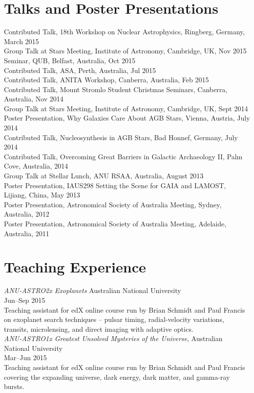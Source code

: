 \documentclass[11pt]{res} %
\begin{document}
\begin{resume}
\section{Talks and Poster Presentations}
	Contributed Talk, 18th Workshop on Nuclear Astrophysics, Ringberg, Germany, March 2015\\
	Group Talk at Stars Meeting, Institute of Astronomy, Cambridge, UK, Nov 2015\\
	Seminar, QUB, Belfast, Australia, Oct 2015\\
	Contributed Talk, ASA, Perth, Australia, Jul 2015\\
	Contributed Talk, ANITA Workshop, Canberra, Australia, Feb 2015\\
	Contributed Talk, Mount Stromlo Student Christmas Seminars, Canberra, Australia, Nov 2014\\
	Group Talk at Stars Meeting, Institute of Astronomy, Cambridge, UK, Sept 2014\\
	Poster Presentation, Why Galaxies Care About AGB Stars, Vienna, Austria, July 2014\\
	Contributed Talk, Nucleosynthesis in AGB Stars, Bad Honnef, Germany, July 2014\\
	Contributed Talk, Overcoming Great Barriers in Galactic Archaeology II, Palm Cove, Australia, 2014\\
	Group Talk at Stellar Lunch, ANU RSAA, Australia, August 2013\\
	Poster Presentation, IAUS298 Setting the Scene for GAIA and LAMOST, Lijiang, China, May 2013\\
	Poster Presentation, Astronomical Society of Australia Meeting, Sydney, Australia, 2012\\
	Poster Presentation, Astronomical Society of Australia Meeting, Adelaide, Australia, 2011	

\section{Teaching Experience}
	{\it ANU-ASTRO2x Exoplanets} \hfill Australian National University\\
	\null\hfill Jun--Sep 2015\\
	Teaching assistant for edX online course run by Brian Schmidt and Paul Francis on exoplanet search techniques -- pulsar timing, radial-velocity variations, transits, microlensing, and direct imaging with adaptive optics.\\

	{\it ANU-ASTRO1x Greatest Unsolved Mysteries of the Universe}, \hfill Australian National University\\
	\null\hfill Mar--Jun 2015\\
	Teaching assistant for edX online course run by Brian Schmidt and Paul Francis covering the expanding universe, dark energy, dark matter, and gamma-ray bursts.\\


\end{resume}
\end{document}
